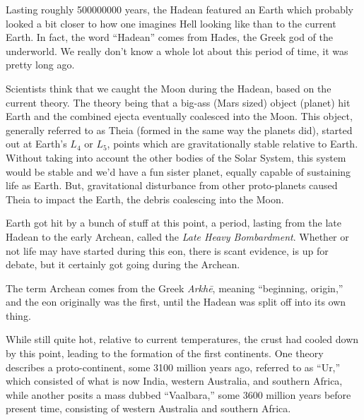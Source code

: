 \documentclass[./butidigress.tex]{subfiles}
\begin{document}
Lasting roughly \num{500000000} years, the Hadean featured an Earth which probably looked a bit closer to how one imagines Hell looking like than to the current Earth.
In fact, the word \enquote{Hadean} comes from Hades, the Greek god of the underworld.
We really don't know a whole lot about this period of time, it was pretty long ago.

Scientists think that we caught the Moon during the Hadean, based on the current theory.
The theory being that a big-ass (Mars sized) object (planet) hit Earth and the combined ejecta eventually coalesced into the Moon.\autocite{wheredidthemooncomefrom}
This object, generally referred to as Theia (formed in the same way the planets did), started out at Earth's $L_{4}$ or $L_{5}$, points which are gravitationally stable relative to Earth.\autocite[3--4]{wheredidthemooncomefrom}
Without taking into account the other bodies of the Solar System, this system would be stable and we'd have a fun sister planet, equally capable of sustaining life as Earth.
But, gravitational disturbance from other proto-planets caused Theia to impact the Earth, the debris coalescing into the Moon.\autocite[44--47]{wheredidthemooncomefrom}

Earth got hit by a bunch of stuff at this point, a period, lasting from the late Hadean to the early Archean, called the \emph{Late Heavy Bombardment}.\autocite{lunarbombardment}
Whether or not life may have started during this eon, there is scant evidence, is up for debate, but it certainly got going during the Archean.

The term Archean comes from the Greek \emph{Arkh\={e}}, meaning \enquote{beginning, origin,} and the eon originally was the first, until the Hadean was split off into its own thing.

While still quite hot, relative to current temperatures, the crust had cooled down by this point, leading to the formation of the first continents.
One theory describes a proto-continent, some \num{3100} million years ago, referred to as \enquote{Ur,} which consisted of what is now India, western Australia, and southern Africa,\autocite{historyofcontinents} while another posits a mass dubbed \enquote{Vaalbara,} some \num{3600} million years before present time, consisting of western Australia and southern Africa.\autocite{sequencestratigraphy}
\end{document}
